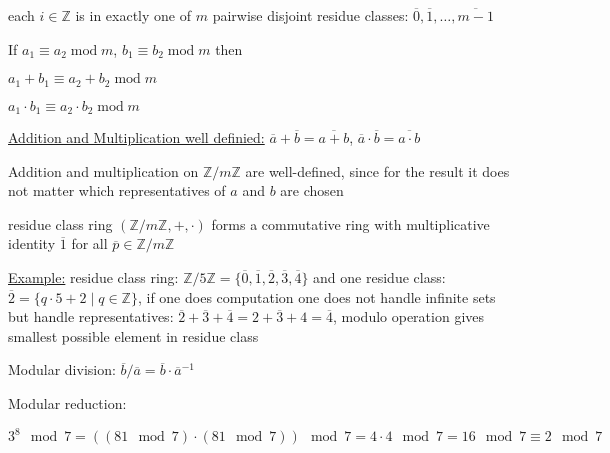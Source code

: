 \documentclass[landscape, a4paper]{article}
\begin{document}
\begin{minipage}[t]{0.2\linewidth}
\begin{betterlist}
\begin{betterlist}
			\item each $i \in \mathbb{Z}$ is in exactly one of $m$ pairwise disjoint residue classes: $\overline{0}, \overline{1}, \ldots, \overline{m-1}$
		\end{betterlist}
		\item If $a_1 \equiv a_2 \operatorname{mod} m$, $b_1 \equiv b_2 \operatorname{mod} m$ then
		\begin{betterlist}
			\item $a_1 + b_1 \equiv a_2 + b_2 \operatorname{mod} m$
			\item $a_1 \cdot b_1 \equiv a_2 \cdot b_2 \operatorname{mod} m$
		\end{betterlist}
		\item \underline{Addition and Multiplication well definied:} $\overline{a} + \overline{b} = \overline{a + b}$, $\overline{a} \cdot \overline{b} = \overline{a \cdot b}$
		\begin{betterlist}
			\item Addition and multiplication on $\mathbb{Z}/m\mathbb{Z}$ are \alert{well-defined}, since for the result it does not matter which representatives of $a$ and $b$ are chosen
			\item residue class ring $(\mathbb{Z}/m\mathbb{Z}, +, \cdot)$ forms a \alert{commutative ring} with \alert{multiplicative identity} $\overline{1}$ for all $\overline{p} \in \mathbb{Z}/m\mathbb{Z}$
			\item \underline{Example:} \alert{residue class ring:} $\mathbb{Z}/5\mathbb{Z} = \{\overline{0}, \overline{1}, \overline{2}, \overline{3}, \overline{4}\}$ and one \alert{residue class:} $\overline{2} = \{q\cdot 5 + 2 \mid q\in \mathbb{Z}\}$, if one does computation one does not handle infinite sets but handle representatives: $\overline{2} + \overline{3} + \overline{4} = \overline{2 + 3 + 4} = \overline{4}$, modulo operation gives smallest possible element in residue class
			\item \alert{Modular division:} $\overline{b}/\overline{a} = \overline{b}\cdot \overline{a}^{-1}$
			\item \alert{Modular reduction:}
			\begin{betterlist}
				\item $3^8 \mod 7 = ((81 \mod 7) \cdot (81 \mod 7)) \mod 7 = 4 \cdot 4 \mod 7 = 16 \mod 7 \equiv 2 \mod 7$
			\end{betterlist}
		\end{betterlist}
	\end{betterlist}

\end{minipage}
\end{document}
